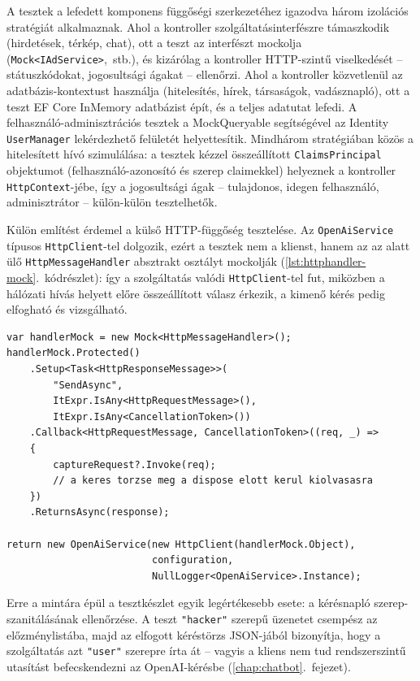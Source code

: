 A tesztek a lefedett komponens függőségi szerkezetéhez igazodva három izolációs stratégiát
alkalmaznak. Ahol a kontroller szolgáltatásinterfészre támaszkodik (hirdetések, térkép, chat),
ott a teszt az interfészt mockolja (\texttt{Mock<IAdService>},~stb.), és kizárólag a
kontroller HTTP-szintű viselkedését -- státuszkódokat, jogosultsági ágakat -- ellenőrzi. Ahol a
kontroller közvetlenül az adatbázis-kontextust használja (hitelesítés, hírek, társaságok,
vadásznapló), ott a teszt EF Core InMemory adatbázist épít, és a teljes adatutat lefedi. A
felhasználó-adminisztrációs tesztek a MockQueryable segítségével az Identity
\texttt{UserManager} lekérdezhető felületét helyettesítik. Mindhárom stratégiában közös a
hitelesített hívó szimulálása: a tesztek kézzel összeállított \texttt{ClaimsPrincipal}
objektumot (felhasználó-azonosító és szerep claimekkel) helyeznek a kontroller
\texttt{HttpContext}-jébe, így a jogosultsági ágak -- tulajdonos, idegen felhasználó,
adminisztrátor -- külön-külön tesztelhetők.

Külön említést érdemel a külső HTTP-függőség tesztelése. Az \texttt{OpenAiService} típusos
\texttt{HttpClient}-tel dolgozik, ezért a tesztek nem a klienst, hanem az az alatt ülő
\texttt{HttpMessageHandler} absztrakt osztályt mockolják
(\ref{lst:httphandler-mock}.~kódrészlet): így a szolgáltatás valódi \texttt{HttpClient}-tel fut,
miközben a hálózati hívás helyett előre összeállított válasz érkezik, a kimenő kérés pedig
elfogható és vizsgálható.

\begin{lstlisting}[language={[Sharp]C}, caption={A \texttt{HttpMessageHandler} mockolása az \texttt{OpenAiServiceTests}-ben (kivonat)}, label={lst:httphandler-mock}]
var handlerMock = new Mock<HttpMessageHandler>();
handlerMock.Protected()
    .Setup<Task<HttpResponseMessage>>(
        "SendAsync",
        ItExpr.IsAny<HttpRequestMessage>(),
        ItExpr.IsAny<CancellationToken>())
    .Callback<HttpRequestMessage, CancellationToken>((req, _) =>
    {
        captureRequest?.Invoke(req);
        // a keres torzse meg a dispose elott kerul kiolvasasra
    })
    .ReturnsAsync(response);

return new OpenAiService(new HttpClient(handlerMock.Object),
                         configuration,
                         NullLogger<OpenAiService>.Instance);
\end{lstlisting}

Erre a mintára épül a tesztkészlet egyik legértékesebb esete: a kérésnapló
szerep-szanitálásának ellenőrzése. A teszt \texttt{"hacker"} szerepű üzenetet csempész az
előzménylistába, majd az elfogott kéréstörzs JSON-jából bizonyítja, hogy a szolgáltatás azt
\texttt{"user"} szerepre írta át -- vagyis a kliens nem tud rendszerszintű utasítást
befecskendezni az OpenAI-kérésbe (\ref{chap:chatbot}.~fejezet).

